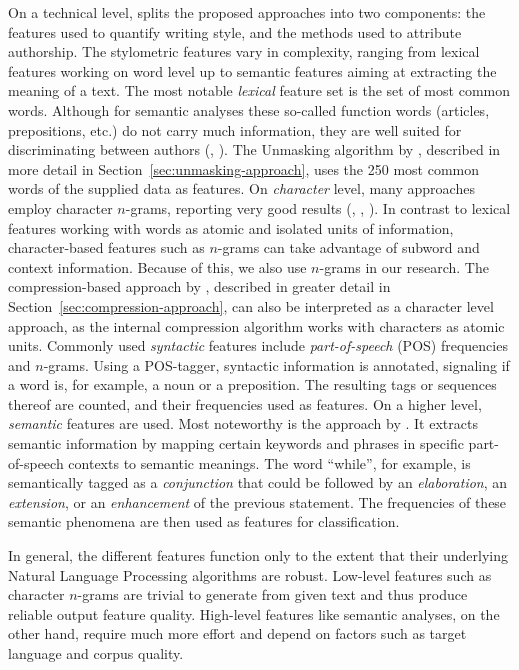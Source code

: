 On a technical level, \citeauthor{stamatatos2009survey} splits the proposed approaches into two components: the features used to quantify writing style, and the methods used to attribute authorship.
The stylometric features vary in complexity, ranging from lexical features working on word level up to semantic features aiming at extracting the meaning of a text.
The most notable \textit{lexical} feature set is the set of most common words.
Although for semantic analyses these so-called function words (articles, prepositions, etc.) do not carry much information, they are well suited for discriminating between authors (\cite{argamon2005measuring}, \cite{burrows1987word}).
The Unmasking algorithm by \cite{koppel2004unmasking}, described in more detail in Section~\ref{sec:unmasking-approach}, uses the 250 most common words of the supplied data as features.
On \textit{character} level, many approaches employ character $n$-grams, reporting very good results (\cite{peng2003language}, \cite{kevselj2003n}, \cite{stamatatos2006ensemble}).
In contrast to lexical features working with words as atomic and isolated units of information, character-based features such as $n$-grams can take advantage of subword and context information.
Because of this, we also use $n$-grams in our research.
The compression-based approach by \cite{teahan2003compression}, described in greater detail in Section~\ref{sec:compression-approach}, can also be interpreted as a character level approach, as the internal compression algorithm works with characters as atomic units.
Commonly used \textit{syntactic} features include \textit{part-of-speech} (POS) frequencies and $n$-grams.
Using a POS-tagger, syntactic information is annotated, signaling if a word is, for example, a noun or a preposition.
The resulting tags or sequences thereof are counted, and their frequencies used as features.
On a higher level, \textit{semantic} features are used.
Most noteworthy is the approach by \cite{argamon2007stylistic}.
It extracts semantic information by mapping certain keywords and phrases in specific part-of-speech contexts to semantic meanings.
The word ``while'', for example, is semantically tagged as a \textit{conjunction} that could be followed by an \textit{elaboration}, an \textit{extension}, or an \textit{enhancement} of the previous statement.
The frequencies of these semantic phenomena are then used as features for classification.

In general, the different features function only to the extent that their underlying Natural Language Processing algorithms are robust.
Low-level features such as character $n$-grams are trivial to generate from given text and thus produce reliable output feature quality.
High-level features like semantic analyses, on the other hand, require much more effort and depend on factors such as target language and corpus quality.

